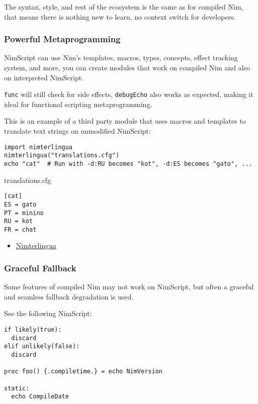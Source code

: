 The syntax, style, and rest of the ecosystem is the same as for compiled
Nim, that means there is nothing new to learn, no context switch for
developers.

\hypertarget{powerful-metaprogramming}{%
\subsubsection{Powerful
Metaprogramming}\label{powerful-metaprogramming}}

NimScript can use Nim's templates, macros, types, concepts, effect
tracking system, and more, you can create modules that work on compiled
Nim and also on interpreted NimScript.

\texttt{func} will still check for side effects, \texttt{debugEcho} also
works as expected, making it ideal for functional scripting
metaprogramming.

This is an example of a third party module that uses macros and
templates to translate text strings on unmodified NimScript:

\begin{verbatim}
import nimterlingua
nimterlingua("translations.cfg")
echo "cat"  # Run with -d:RU becomes "kot", -d:ES becomes "gato", ...
\end{verbatim}

translations.cfg

\begin{verbatim}
[cat]
ES = gato
PT = minino
RU = kot
FR = chat
\end{verbatim}

\begin{itemize}
\tightlist
\item
  \href{https://nimble.directory/pkg/nimterlingua}{Nimterlingua}
\end{itemize}

\hypertarget{graceful-fallback}{%
\subsubsection{Graceful Fallback}\label{graceful-fallback}}

Some features of compiled Nim may not work on NimScript, but often a
graceful and seamless fallback degradation is used.

See the following NimScript:

\begin{verbatim}
if likely(true):
  discard
elif unlikely(false):
  discard

proc foo() {.compiletime.} = echo NimVersion

static:
  echo CompileDate
\end{verbatim}

